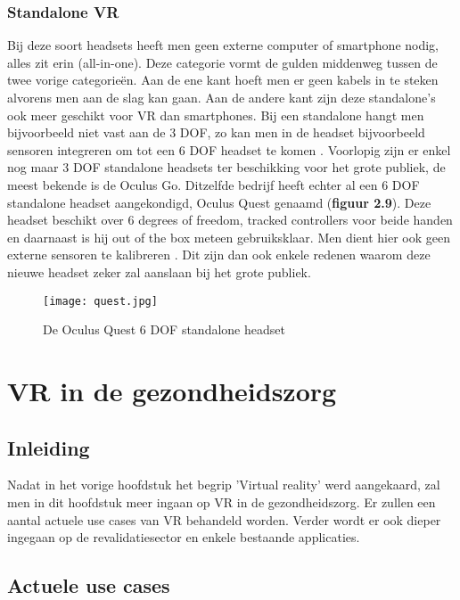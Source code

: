 \subsection{Standalone VR}
Bij deze soort headsets heeft men geen externe computer of smartphone nodig, alles zit erin (all-in-one). Deze categorie vormt de gulden middenweg tussen de twee vorige categorieën. Aan de ene kant hoeft men er geen kabels in te steken alvorens men aan de slag kan gaan. Aan de andere kant zijn deze standalone's ook meer geschikt voor VR dan smartphones. Bij een standalone hangt men bijvoorbeeld niet vast aan de 3 DOF, zo kan men in de headset bijvoorbeeld sensoren integreren om tot een 6 DOF headset te komen  \autocite{Cherdo2018}. Voorlopig zijn er enkel nog maar 3 DOF standalone headsets ter beschikking voor het grote publiek, de meest bekende is de Oculus Go. Ditzelfde bedrijf heeft echter al een 6 DOF standalone headset aangekondigd, Oculus Quest genaamd (\textbf{figuur 2.9}). Deze headset beschikt over 6 degrees of freedom, tracked controllers voor beide handen en daarnaast is hij out of the box meteen gebruiksklaar. Men dient hier ook geen externe sensoren te kalibreren  \autocite{Oculus2019}. Dit zijn dan ook enkele redenen waarom deze nieuwe headset zeker zal aanslaan bij het grote publiek.

\begin{figure}[h]
    \centering
    \texttt{[image: quest.jpg]}
    \caption{De Oculus Quest 6 DOF standalone headset \autocite{Oculus2019}}
\end{figure}


\chapter{VR in de gezondheidszorg}
\section{Inleiding}
Nadat in het vorige hoofdstuk het begrip 'Virtual reality' werd aangekaard, zal men in dit hoofdstuk meer ingaan op VR in de gezondheidszorg. Er zullen een aantal actuele use cases van VR behandeld worden. Verder wordt er ook dieper ingegaan op de revalidatiesector en enkele bestaande applicaties.

\section{Actuele use cases}
